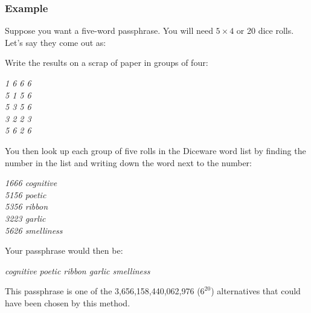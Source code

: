 \newpage

\setlength{\parskip}{0.5em}

\subsubsection*{Example}

Suppose you want a five-word passphrase. You will need $5 \times 4$ or 20 dice rolls. Let's say they come out as:

\begin{adjustwidth}{2em}{2em}
\end{adjustwidth}

Write the results on a scrap of paper in groups of four:

\begin{adjustwidth}{2em}{2em}
\textit{1 6 6 6 \\
5 1 5 6 \\
5 3 5 6 \\
3 2 2 3 \\
5 6 2 6}
\end{adjustwidth}

You then look up each group of five rolls in the Diceware word list by finding the number in the list and writing down the word next to the number:

\begin{adjustwidth}{2em}{2em}
\textit{1666 cognitive \\
5156 poetic \\
5356 ribbon \\
3223 garlic \\
5626 smelliness}
\end{adjustwidth}

Your passphrase would then be:

\begin{adjustwidth}{2em}{2em}
\textit{cognitive poetic ribbon garlic smelliness}
\end{adjustwidth}

This passphrase is one of the 3,656,158,440,062,976 ($6^{20}$) alternatives that could have been chosen by this method.


\setlength{\parskip}{0.25em}
